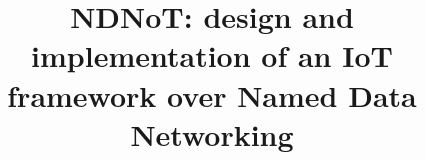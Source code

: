 \documentclass{sig-alternate-05-2015}
\begin{document}






%


\title{NDNoT: design and implementation of an IoT framework over Named Data Networking}



%
%
%
%
\end{document}
